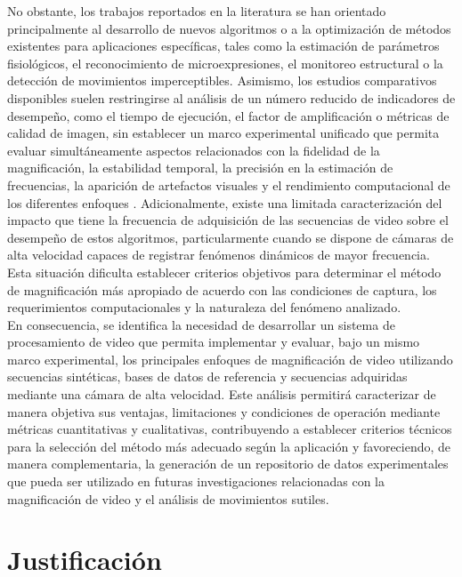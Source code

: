 No obstante, los trabajos reportados en la literatura se han orientado principalmente al desarrollo de nuevos algoritmos o a la optimización de métodos existentes para aplicaciones específicas, tales como la estimación de parámetros fisiológicos, el reconocimiento de microexpresiones, el monitoreo estructural o la detección de movimientos imperceptibles. Asimismo, los estudios comparativos disponibles suelen restringirse al análisis de un número reducido de indicadores de desempeño, como el tiempo de ejecución, el factor de amplificación o métricas de calidad de imagen, sin establecer un marco experimental unificado que permita evaluar simultáneamente aspectos relacionados con la fidelidad de la magnificación, la estabilidad temporal, la precisión en la estimación de frecuencias, la aparición de artefactos visuales y el rendimiento computacional de los diferentes enfoques \cite{yadav2020performance}. Adicionalmente, existe una limitada caracterización del impacto que tiene la frecuencia de adquisición de las secuencias de video sobre el desempeño de estos algoritmos, particularmente cuando se dispone de cámaras de alta velocidad capaces de registrar fenómenos dinámicos de mayor frecuencia. Esta situación dificulta establecer criterios objetivos para determinar el método de magnificación más apropiado de acuerdo con las condiciones de captura, los requerimientos computacionales y la naturaleza del fenómeno analizado.\\

En consecuencia, se identifica la necesidad de desarrollar un sistema de procesamiento de video que permita implementar y evaluar, bajo un mismo marco experimental, los principales enfoques de magnificación de video utilizando secuencias sintéticas, bases de datos de referencia y secuencias adquiridas mediante una cámara de alta velocidad. Este análisis permitirá caracterizar de manera objetiva sus ventajas, limitaciones y condiciones de operación mediante métricas cuantitativas y cualitativas, contribuyendo a establecer criterios técnicos para la selección del método más adecuado según la aplicación y favoreciendo, de manera complementaria, la generación de un repositorio de datos experimentales que pueda ser utilizado en futuras investigaciones relacionadas con la magnificación de video y el análisis de movimientos sutiles.


\section{Justificación}
\label{sec:Justificacion}



